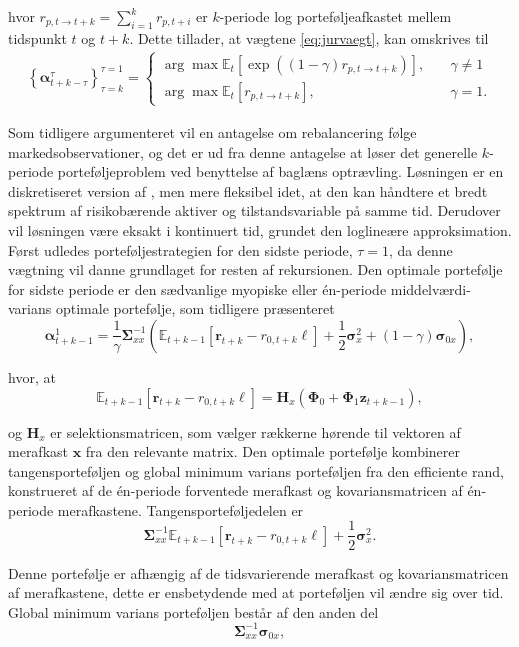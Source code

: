\documentclass[
  a4paper,
  oneside]{memoir}
\begin{document}
hvor \(r_{p,t\to t+k}=\sum_{i=1}^k r_{p,t+i}\) er \(k\)-periode log porteføljeafkastet mellem tidspunkt \(t\) og \(t+k\). Dette tillader, at vægtene \eqref{eq:jurvaegt}, kan omskrives til
\begin{align}
\left\{\bm{\alpha}_{t+k-\tau}^\tau\right\}_{\tau=k}^{\tau=1}=\begin{cases}
\arg\max\mathbb{E}_t\left[\exp ((1-\gamma) r_{p,t\to t+k})\right],\quad &\gamma\neq 1\\
\arg\max\mathbb{E}_t\left[r_{p,t\to t+k}\right],\quad &\gamma=1.
\end{cases}\label{eq:jurvaegt2}
\end{align}

Som tidligere argumenteret vil en antagelse om rebalancering følge markedsobservationer, og det er ud fra denne antagelse at \citep{JurVic2011} løser det generelle \(k\)-periode porteføljeproblem ved benyttelse af baglæns optrævling. Løsningen er en diskretiseret version af \citep{Liu2007}, men mere fleksibel idet, at den kan håndtere et bredt spektrum af risikobærende aktiver og tilstandsvariable på samme tid. Derudover vil løsningen være eksakt i kontinuert tid, grundet den loglineære approksimation. Først udledes porteføljestrategien for den sidste periode, \(\tau=1\), da denne vægtning vil danne grundlaget for resten af rekursionen. Den optimale portefølje for sidste periode er den sædvanlige myopiske eller én-periode middelværdi-varians optimale portefølje, som tidligere præsenteret
\[\bm{\alpha}_{t+k-1}^1=\frac{1}{\gamma}\bm{\Sigma}_{xx}^{-1}\left(\mathbb{E}_{t+k-1}\left[\bm{r}_{t+k}-r_{0,t+k}\bm{\ell}\right]+\frac{1}{2}\bm{\sigma}_x^2 + (1-\gamma) \bm{\sigma}_{0x}\right),\]

hvor, at
\[\mathbb{E}_{t+k-1}\left[\bm{r}_{t+k}-r_{0,t+k}\bm{\ell}\right]=\bm{H}_x(\bm{\Phi}_0 + \bm{\Phi}_1 \bm{z}_{t+k-1}),\]

og \(\bm{H}_x\) er selektionsmatricen, som vælger rækkerne hørende til vektoren af merafkast \(\bm{x}\) fra den relevante matrix. Den optimale portefølje kombinerer tangensporteføljen og global minimum varians porteføljen fra den efficiente rand, konstrueret af de én-periode forventede merafkast og kovariansmatricen af én-periode merafkastene. Tangensporteføljedelen er
\[\bm{\Sigma}_{xx}^{-1}\mathbb{E}_{t+k-1}\left[\bm{r}_{t+k}-r_{0,t+k}\bm{\ell}\right]+\frac{1}{2}\bm{\sigma}_x^2.\]

Denne portefølje er afhængig af de tidsvarierende merafkast og kovariansmatricen af merafkastene, dette er ensbetydende med at porteføljen vil ændre sig over tid. Global minimum varians porteføljen består af den anden del
\[\bm{\Sigma}_{xx}^{-1}\bm{\sigma}_{0x},\]
\end{document}

